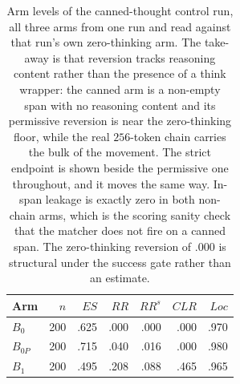 \documentclass[letterpaper]{article}
\begin{document}
\begin{table}[t]
\centering
\small
\begin{tabular}{@{}lrrrrrr@{}}
\toprule
Arm & \(n\) & \(ES\) & \(RR\) & \(RR^s\) & \(CLR\) & \(Loc\) \\
\midrule
\(B_0\)   & 200 & .625 & .000 & .000 & .000 & .970 \\
\(B_{0P}\)& 200 & .715 & .040 & .016 & .000 & .980 \\
\(B_1\)   & 200 & .495 & .208 & .088 & .465 & .965 \\
\bottomrule
\end{tabular}
\caption{Arm levels of the canned-thought control run, all three arms from one
run and read against that run's own zero-thinking arm.  The take-away is that
reversion tracks reasoning content rather than the presence of a think wrapper:
the canned arm is a non-empty span with no reasoning content and its permissive
reversion is near the zero-thinking floor, while the real \(256\)-token chain
carries the bulk of the movement.  The strict endpoint is shown beside the
permissive one throughout, and it moves the same way.  In-span leakage is exactly
zero in both non-chain arms, which is the scoring sanity check that the matcher
does not fire on a canned span.  The zero-thinking reversion of \(.000\) is
structural under the success gate rather than an estimate.}
\label{tab:s8-arms}
\end{table}
\end{document}
